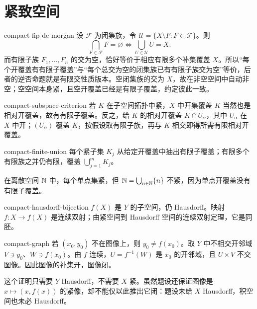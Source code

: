 \chapter{紧致空间}
\label{chap:compact-topological-spaces-solutions}

\begin{solution}{compact-fip-de-morgan}
设 \(\mathcal F\) 为闭集族，令 \(\mathcal U=\{X\setminus F:F\in\mathcal F\}\)。则
\[
 \bigcap_{F\in\mathcal F}F=\varnothing
 \Longleftrightarrow
 \bigcup_{U\in\mathcal U}U=X.
\]
而有限子族 \(F_1,\ldots,F_n\) 的交为空，恰好等价于相应有限多个补集覆盖 \(X\)。所以“每个开覆盖有有限子覆盖”与“每个总交为空的闭集族已有有限子族交为空”等价，后者的逆否命题就是有限交性质版本。空闭集族的交为 \(X\)，故在非空空间中自动非空；空空间本身紧，且空开覆盖已经是有限子覆盖，约定彼此一致。
\end{solution}

\begin{solution}{compact-subspace-criterion}
若 \(K\) 在子空间拓扑中紧，\(X\) 中开集覆盖 \(K\) 当然也是相对开覆盖，故有有限子覆盖。反之，给 \(K\) 的相对开覆盖 \(K\cap U_\alpha\)，其中 \(U_\alpha\) 在 \(X\) 中开；\((U_\alpha)\) 覆盖 \(K\)，按假设取有限子族，再与 \(K\) 相交即得所需有限相对开覆盖。
\end{solution}

\begin{solution}{compact-finite-union}
每个紧子集 \(K_j\) 从给定开覆盖中抽出有限子覆盖；有限多个有限族之并仍有限，覆盖 \(\bigcup_{j=1}^mK_j\)。

在离散空间 \(\mathbb{N}\) 中，每个单点集紧，但
\(\mathbb{N}=\bigcup_{n\in\mathbb{N}}\{n\}\) 不紧，因为单点开覆盖没有有限子覆盖。
\end{solution}

\begin{solution}{compact-hausdorff-bijection}
\(f(X)\) 是 \(Y\) 的子空间，仍 Hausdorff。映射 \(f:X\to f(X)\) 是连续双射；由紧空间到 Hausdorff 空间的连续双射定理，它是同胚。
\end{solution}

\begin{solution}{compact-graph}
若 \((x_0,y_0)\) 不在图像上，则 \(y_0\ne f(x_0)\)。取 \(Y\) 中不相交开邻域 \(V\ni y_0\)、\(W\ni f(x_0)\)。由 \(f\) 连续，\(U=f^{-1}(W)\) 是 \(x_0\) 的开邻域，且 \(U\times V\) 不交图像。因此图像的补集开，图像闭。

这个证明只需要 \(Y\) Hausdorff，不需要 \(X\) 紧。虽然题设还保证图像是 \(x\mapsto(x,f(x))\) 的紧像，却不能仅以此推出它闭：题设未给 \(X\) Hausdorff，积空间也未必 Hausdorff。
\end{solution}

